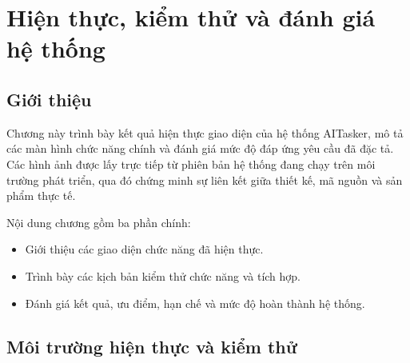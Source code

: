%
%

\chapter{Hiện thực, kiểm thử và đánh giá hệ thống}
\label{chap:implementation-testing}

\section{Giới thiệu}
\label{sec:chapter6-introduction}

Chương này trình bày kết quả hiện thực giao diện của hệ thống AITasker, mô tả các màn hình chức năng chính và đánh giá mức độ đáp ứng yêu cầu đã đặc tả. Các hình ảnh được lấy trực tiếp từ phiên bản hệ thống đang chạy trên môi trường phát triển, qua đó chứng minh sự liên kết giữa thiết kế, mã nguồn và sản phẩm thực tế.

Nội dung chương gồm ba phần chính:

\begin{itemize}
    \item Giới thiệu các giao diện chức năng đã hiện thực.
    \item Trình bày các kịch bản kiểm thử chức năng và tích hợp.
    \item Đánh giá kết quả, ưu điểm, hạn chế và mức độ hoàn thành hệ thống.
\end{itemize}

\section{Môi trường hiện thực và kiểm thử}
\label{sec:implementation-environment}

